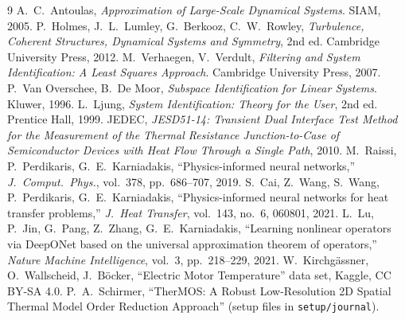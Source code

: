 \documentclass[11pt,a4paper]{article}
\begin{document}
\begin{thebibliography}{9}
 A.\ C.\ Antoulas, \emph{Approximation of Large-Scale Dynamical Systems}. SIAM, 2005.
 P.\ Holmes, J.\ L.\ Lumley, G.\ Berkooz, C.\ W.\ Rowley, \emph{Turbulence, Coherent Structures,
  Dynamical Systems and Symmetry}, 2nd ed. Cambridge University Press, 2012.
 M.\ Verhaegen, V.\ Verdult, \emph{Filtering and System Identification: A Least Squares
  Approach}. Cambridge University Press, 2007.
 P.\ Van Overschee, B.\ De Moor, \emph{Subspace Identification for Linear Systems}. Kluwer, 1996.
 L.\ Ljung, \emph{System Identification: Theory for the User}, 2nd ed. Prentice Hall, 1999.
 JEDEC, \emph{JESD51-14: Transient Dual Interface Test Method for the Measurement of the Thermal
  Resistance Junction-to-Case of Semiconductor Devices with Heat Flow Through a Single Path}, 2010.
 M.\ Raissi, P.\ Perdikaris, G.\ E.\ Karniadakis, ``Physics-informed neural networks,''
  \emph{J.\ Comput.\ Phys.}, vol.\ 378, pp.\ 686--707, 2019.
 S.\ Cai, Z.\ Wang, S.\ Wang, P.\ Perdikaris, G.\ E.\ Karniadakis, ``Physics-informed neural networks for
heat transfer problems,'' \emph{J.\ Heat Transfer}, vol.\ 143, no.\ 6, 060801, 2021.
 L.\ Lu, P.\ Jin, G.\ Pang, Z.\ Zhang, G.\ E.\ Karniadakis, ``Learning nonlinear operators via DeepONet
based on the universal approximation theorem of operators,'' \emph{Nature Machine Intelligence}, vol.\ 3,
pp.\ 218--229, 2021.
 W.\ Kirchgässner, O.\ Wallscheid, J.\ Böcker, ``Electric Motor Temperature'' data set, Kaggle,
  CC BY-SA 4.0.
 P.\ A.\ Schirmer, ``TherMOS: A Robust Low-Resolution 2D Spatial Thermal Model Order Reduction
  Approach'' (setup files in \texttt{setup/journal}).
\end{thebibliography}
\end{document}
